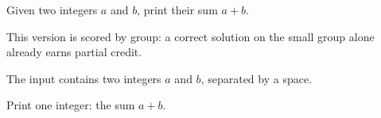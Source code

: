 Given two integers $a$ and $b$, print their sum $a + b$.

This version is scored by group: a correct solution on the small group
alone already earns partial credit.

\InputFile

The input contains two integers $a$ and $b$, separated by a space.

\OutputFile

Print one integer: the sum $a + b$.
